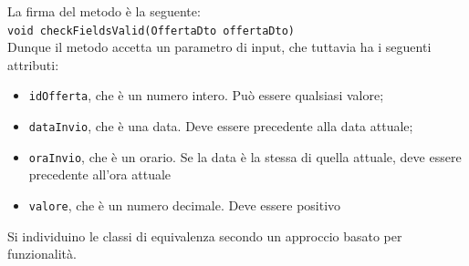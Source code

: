             \noindent La firma del metodo è la seguente:\\
            \texttt{void checkFieldsValid(OffertaDto offertaDto)} \\
            
            \noindent Dunque il metodo accetta un parametro di input, che tuttavia ha i seguenti attributi:
            \begin{itemize}
                \item \texttt{idOfferta}, che è un numero intero. Può essere qualsiasi valore;
                \item \texttt{dataInvio}, che è una data. Deve essere precedente alla data attuale;
                \item \texttt{oraInvio}, che è un orario. Se la data è la stessa di quella attuale, deve essere precedente all'ora attuale
                \item \texttt{valore}, che è un numero decimale. Deve essere positivo \\
            \end{itemize}
            
            \noindent Si individuino le classi di equivalenza secondo un approccio basato per funzionalità.

